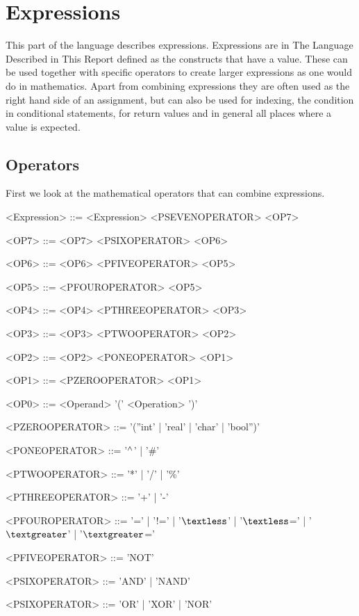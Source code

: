 \section{Expressions}
\label{sec:Expressions}
This part of the language describes expressions. Expressions are in The Language Described in This Report defined as the constructs that have a value. These can be used together with specific operators to create larger expressions as one would do in mathematics. Apart from combining expressions they are often used as the right hand side of an assignment, but can also be used for indexing, the condition in conditional statements, for return values and in general all places where a value is expected.

\subsection{Operators}\label{subsec:operators}
First we look at the mathematical operators that can combine expressions.
\setlength{\grammarindent}{100pt}
\begin{grammar}
<Expression> ::= <Expression> <PSEVENOPERATOR> <OP7>

<OP7> ::= <OP7> <PSIXOPERATOR> <OP6>

<OP6> ::= <OP6> <PFIVEOPERATOR> <OP5>

<OP5> ::= <PFOUROPERATOR> <OP5>

<OP4> ::= <OP4> <PTHREEOPERATOR> <OP3>

<OP3> ::= <OP3> <PTWOOPERATOR> <OP2>

<OP2> ::= <OP2> <PONEOPERATOR> <OP1>

<OP1> ::= <PZEROOPERATOR> <OP1>

<OP0> ::= <Operand>
 \alt '(' <Operation> ')'

<PZEROOPERATOR> ::= '(''int' | 'real' | 'char' | 'bool'')'

<PONEOPERATOR> ::= '$\mathbin{^\wedge{}}$' | '\#'

<PTWOOPERATOR> ::= '*' | '/' | '\%'

<PTHREEOPERATOR> ::= '+' | '-'

<PFOUROPERATOR> ::= '=' | '!=' | '$\textless$' | '$\textless$=' | '$\textgreater$' | '$\textgreater$='

<PFIVEOPERATOR> ::= 'NOT'

<PSIXOPERATOR> ::= 'AND' | 'NAND'

<PSIXOPERATOR> ::= 'OR' | 'XOR' | 'NOR'
\end{grammar}
